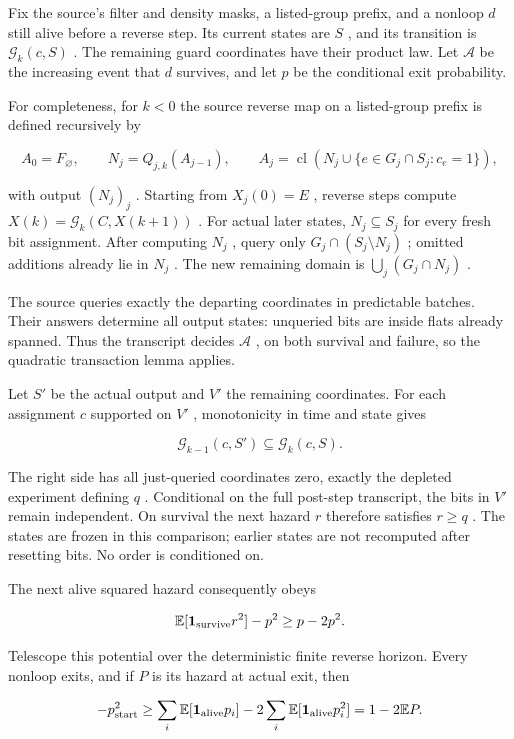 \documentclass[11pt]{article}
\begin{document}
Fix the source's filter and density masks, a listed-group prefix, and a nonloop \(d\) still alive before a reverse step. Its current states are \(S\) , and its transition is \(\mathcal G_k(c,S)\) . The remaining guard coordinates have their product law. Let \(\mathcal A\) be the increasing event that \(d\) survives, and let \(p\) be the conditional exit probability.

For completeness, for \(k<0\) the source reverse map on a listed-group prefix is defined recursively by

\[A_0=F_{\varnothing},\qquad N_j=Q_{j,k}(A_{j-1}),\qquad
 A_j=\operatorname{cl}(N_j\cup\{e\in G_j\cap S_j:c_e=1\}),\]

with output \((N_j)_j\) . Starting from \(X_j(0)=E\) , reverse steps compute \(X(k)=\mathcal G_k(C,X(k+1))\) . For actual later states, \(N_j\subseteq S_j\) for every fresh bit assignment. After computing \(N_j\) , query only \(G_j\cap(S_j\setminus N_j)\) ; omitted additions already lie in \(N_j\) . The new remaining domain is \(\bigcup_j(G_j\cap N_j)\) .

The source queries exactly the departing coordinates in predictable batches. Their answers determine all output states: unqueried bits are inside flats already spanned. Thus the transcript decides \(\mathcal A\) , on both survival and failure, so the quadratic transaction lemma applies.

Let \(S'\) be the actual output and \(V'\) the remaining coordinates. For each assignment \(c\) supported on \(V'\) , monotonicity in time and state gives

\[\mathcal G_{k-1}(c,S')\subseteq\mathcal G_k(c,S).\]

The right side has all just-queried coordinates zero, exactly the depleted experiment defining \(q\) . Conditional on the full post-step transcript, the bits in \(V'\) remain independent. On survival the next hazard \(r\) therefore satisfies \(r\ge q\) . The states are frozen in this comparison; earlier states are not recomputed after resetting bits. No order is conditioned on.

The next alive squared hazard consequently obeys

\[\mathbb{E}[\mathbf 1_{\rm survive}r^2]-p^2\ge p-2p^2.\]

Telescope this potential over the deterministic finite reverse horizon. Every nonloop exits, and if \(P\) is its hazard at actual exit, then

\[-p_{\rm start}^2\ge
 \sum_i\mathbb{E}[\mathbf 1_{\rm alive}p_i]-2\sum_i\mathbb{E}[\mathbf 1_{\rm alive}p_i^2]
 =1-2\mathbb{E}P.\]
\end{document}

